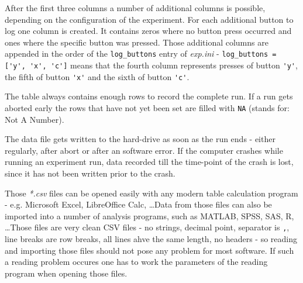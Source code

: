 \documentclass[12pt,a4paper]{book}
\begin{document}
After the first three columns a number of additional columns is possible, depending on the configuration of the experiment. For each additional button to log one column is created. It contains zeros where no button press occurred and ones where the specific button was pressed. Those additional columns are appended in the order of the \verb|log_buttons| entry of \textit{exp.ini} - \verb|log_buttons = ['y', 'x', 'c']| means that the fourth column represents presses of button \verb|'y'|, the fifth of button \verb|'x'| and the sixth of button \verb|'c'|.

The table always contains enough rows to record the complete run. If a run gets aborted early the rows that have not yet been set are filled with \verb|NA| (stands for: Not A Number).

The data file gets written to the hard-drive as soon as the run ends - either regularly, after abort or after an software error. If the computer crashes while running an experiment run, data recorded till the time-point of the crash is lost, since it has not been written prior to the crash.

Those \textit{*.csv} files can be opened easily with any modern table calculation program - e.g. Microsoft Excel, LibreOffice Calc, \dots Data from those files can also be imported into a number of analysis programs, such as MATLAB, SPSS, SAS, R, \dots Those files are very clean CSV files - no strings, decimal point, separator is \verb|,|, line breaks are row breaks, all lines ahve the same length, no headers - so reading and importing those files should not pose any problem for most software. If such a reading problem occures one has to work the parameters of the reading program when opening those files.
\end{document}
